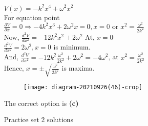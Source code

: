 \begin{enumerate}
\begin{answer}
	\begin{minipage}{0.5\textwidth}
	$V(x)=-k^{2} x^{4}+\omega^{2} x^{2}$\\
	For equation point\\
	$
	\frac{\partial V}{\partial x}=0 \Rightarrow-4 k^{2} x^{3}+2 \omega^{2} x=0, x=0 \text { or } x^{2}=\frac{\omega^{2}}{2 k^{2}}
	$\\
	Now, $\frac{d^{2} V}{d x^{2}}=-12 k^{2} x^{2}+2 \omega^{2}$ At, $x=0$\\
	$\frac{d^{2} V}{d x^{2}}=2 \omega^{2}, x=0$ is minimum.\\
	And, $\frac{d^{2} V}{d x^{2}}=-12 k^{2} \frac{\omega^{2}}{2 k^{2}}+2 \omega^{2}=-4 \omega^{2}$, at $x^{2}=\frac{\omega^{2}}{2 k^{2}}$\\
	Hence, $x=\pm \sqrt{\frac{\omega^{2}}{2 k^{2}}}$ is maxima.
	\end{minipage}
	 \begin{minipage}{0.5\textwidth}
	 \begin{figure}[H]
	 	\centering
	 	\texttt{[image: diagram-20210926(46)-crop]}
	 \end{figure}
	 \end{minipage}
 The correct option is \textbf{(c)}
\end{answer}
\end{enumerate}
\newpage
\begin{abox}
	Practice set 2 solutions
	\end{abox}
